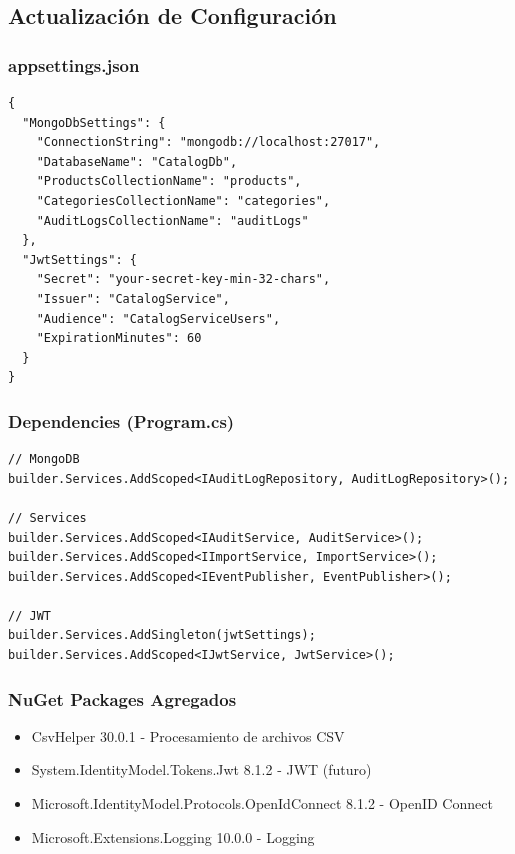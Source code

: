 \documentclass[12pt,a4paper]{article}
\begin{document}
\subsection{Actualización de Configuración}

\subsubsection{appsettings.json}

\begin{lstlisting}
{
  "MongoDbSettings": {
    "ConnectionString": "mongodb://localhost:27017",
    "DatabaseName": "CatalogDb",
    "ProductsCollectionName": "products",
    "CategoriesCollectionName": "categories",
    "AuditLogsCollectionName": "auditLogs"
  },
  "JwtSettings": {
    "Secret": "your-secret-key-min-32-chars",
    "Issuer": "CatalogService",
    "Audience": "CatalogServiceUsers",
    "ExpirationMinutes": 60
  }
}
\end{lstlisting}

\subsubsection{Dependencies (Program.cs)}

\begin{lstlisting}
// MongoDB
builder.Services.AddScoped<IAuditLogRepository, AuditLogRepository>();

// Services
builder.Services.AddScoped<IAuditService, AuditService>();
builder.Services.AddScoped<IImportService, ImportService>();
builder.Services.AddScoped<IEventPublisher, EventPublisher>();

// JWT
builder.Services.AddSingleton(jwtSettings);
builder.Services.AddScoped<IJwtService, JwtService>();
\end{lstlisting}

\subsubsection{NuGet Packages Agregados}

\begin{itemize}
    \item CsvHelper 30.0.1 - Procesamiento de archivos CSV
    \item System.IdentityModel.Tokens.Jwt 8.1.2 - JWT (futuro)
    \item Microsoft.IdentityModel.Protocols.OpenIdConnect 8.1.2 - OpenID Connect
    \item Microsoft.Extensions.Logging 10.0.0 - Logging
\end{itemize}
\end{document}
